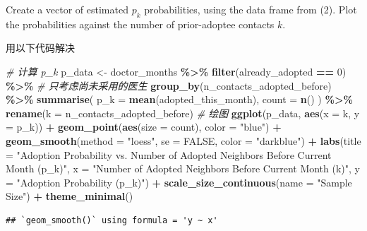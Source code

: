 \documentclass[
]{article}
\newenvironment{Shaded}{\begin{snugshade}}{\end{snugshade}}
\newcommand{\AttributeTok}[1]{\textcolor[rgb]{0.13,0.29,0.53}{#1}}
\newcommand{\CommentTok}[1]{\textcolor[rgb]{0.56,0.35,0.01}{\textit{#1}}}
\newcommand{\ConstantTok}[1]{\textcolor[rgb]{0.56,0.35,0.01}{#1}}
\newcommand{\DecValTok}[1]{\textcolor[rgb]{0.00,0.00,0.81}{#1}}
\newcommand{\FunctionTok}[1]{\textcolor[rgb]{0.13,0.29,0.53}{\textbf{#1}}}
\newcommand{\NormalTok}[1]{#1}
\newcommand{\OtherTok}[1]{\textcolor[rgb]{0.56,0.35,0.01}{#1}}
\newcommand{\SpecialCharTok}[1]{\textcolor[rgb]{0.81,0.36,0.00}{\textbf{#1}}}
\newcommand{\StringTok}[1]{\textcolor[rgb]{0.31,0.60,0.02}{#1}}
\begin{document}
Create a vector of estimated \(p_k\) probabilities, using the data frame
from (2). Plot the probabilities against the number of prior-adoptee
contacts \(k\).

用以下代码解决

\begin{Shaded}
\begin{Highlighting}[]
\CommentTok{\# 计算 p\_k}
\NormalTok{p\_data }\OtherTok{\textless{}{-}}\NormalTok{ doctor\_months }\SpecialCharTok{\%\textgreater{}\%}
\FunctionTok{filter}\NormalTok{(already\_adopted }\SpecialCharTok{==} \DecValTok{0}\NormalTok{) }\SpecialCharTok{\%\textgreater{}\%} \CommentTok{\# 只考虑尚未采用的医生}
\FunctionTok{group\_by}\NormalTok{(n\_contacts\_adopted\_before) }\SpecialCharTok{\%\textgreater{}\%}
\FunctionTok{summarise}\NormalTok{(}
\AttributeTok{p\_k =} \FunctionTok{mean}\NormalTok{(adopted\_this\_month),}
\AttributeTok{count =} \FunctionTok{n}\NormalTok{()}
\NormalTok{) }\SpecialCharTok{\%\textgreater{}\%}
\FunctionTok{rename}\NormalTok{(}\AttributeTok{k =}\NormalTok{ n\_contacts\_adopted\_before)}
\CommentTok{\# 绘图}
\FunctionTok{ggplot}\NormalTok{(p\_data, }\FunctionTok{aes}\NormalTok{(}\AttributeTok{x =}\NormalTok{ k, }\AttributeTok{y =}\NormalTok{ p\_k)) }\SpecialCharTok{+}
\FunctionTok{geom\_point}\NormalTok{(}\FunctionTok{aes}\NormalTok{(}\AttributeTok{size =}\NormalTok{ count), }\AttributeTok{color =} \StringTok{"blue"}\NormalTok{) }\SpecialCharTok{+}
\FunctionTok{geom\_smooth}\NormalTok{(}\AttributeTok{method =} \StringTok{"loess"}\NormalTok{, }\AttributeTok{se =} \ConstantTok{FALSE}\NormalTok{, }\AttributeTok{color =} \StringTok{"darkblue"}\NormalTok{) }\SpecialCharTok{+}
  \FunctionTok{labs}\NormalTok{(}\AttributeTok{title =} \StringTok{"Adoption Probability vs. Number of Adopted Neighbors Before Current Month (p\_k)"}\NormalTok{,}
\AttributeTok{x =} \StringTok{"Number of Adopted Neighbors Before Current Month (k)"}\NormalTok{,}
\AttributeTok{y =} \StringTok{"Adoption Probability (p\_k)"}\NormalTok{) }\SpecialCharTok{+}
\FunctionTok{scale\_size\_continuous}\NormalTok{(}\AttributeTok{name =} \StringTok{"Sample Size"}\NormalTok{) }\SpecialCharTok{+}
\FunctionTok{theme\_minimal}\NormalTok{()}
\end{Highlighting}
\end{Shaded}

\begin{verbatim}
## `geom_smooth()` using formula = 'y ~ x'
\end{verbatim}
\end{document}
